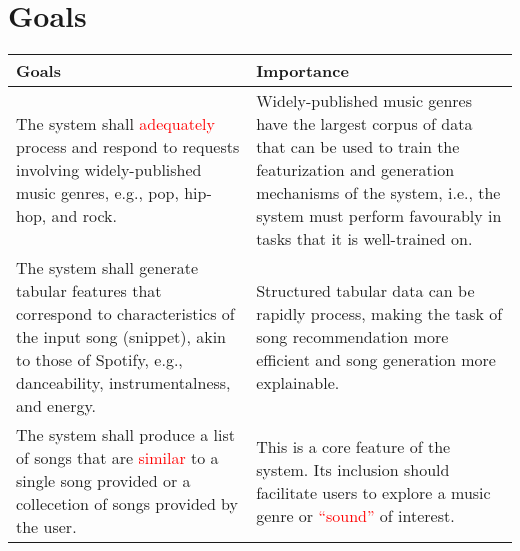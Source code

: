 \documentclass{article}
\begin{document}
\section{Goals}
\begin{table}[h]
    \centering
    \begin{tabular}{|| p{} | p{} ||}
        \hline
        \textbf{Goals} & \textbf{Importance} \\
        \hline
        The system shall \textcolor{red}{adequately} process and respond to 
        requests involving widely-published music genres, e.g., pop, hip-hop, 
        and rock. & Widely-published music genres have the largest corpus of 
        data that can be used to train the featurization and generation 
        mechanisms of the system, i.e., the system must perform favourably in 
        tasks that it is well-trained on. \\
        \hline
        The system shall generate tabular features that correspond to characteristics 
        of the input song (snippet), akin to those of Spotify, e.g., danceability, 
        instrumentalness, and energy. & Structured tabular data can be rapidly process, 
        making the task of song recommendation more efficient and song generation 
        more explainable. \\
        \hline
        The system shall produce a list of songs that are \textcolor{red}{similar} 
        to a single song provided or a collecetion of songs provided by the user. & 
        This is a core feature of the system. Its inclusion should facilitate users 
        to explore a music genre or \textcolor{red}{``sound''} of interest. \\
        \hline
    \end{tabular}
\end{table}
\end{document}
